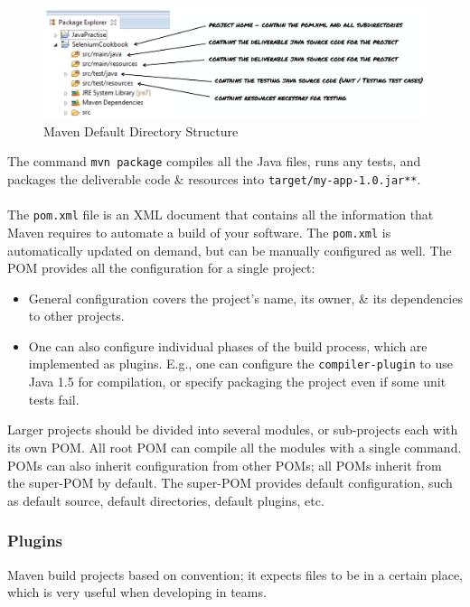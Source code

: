 \documentclass[a4paper,11pt]{article}
\begin{document}
\begin{figure}[H]
    \centering
    \includegraphics[width=\textwidth]{images/mvn_dir_structure.png}
    \caption{Maven Default Directory Structure}
\end{figure}

The command \texttt{mvn package} compiles all the Java files, runs any tests, and packages the 
deliverable code \& resources into \verb|target/my-app-1.0.jar**|.
\\\\
The \verb|pom.xml| file is an XML document that contains all the information that Maven requires to automate 
a build of your software.
The \verb|pom.xml| is automatically updated on demand, but can be manually configured as well.
The POM provides all the configuration for a single project:
\begin{itemize}
    \item   General configuration covers the project's name, its owner, \& its dependencies to other projects.
    \item   One can also configure individual phases of the build process, which are implemented as plugins.
            E.g., one can configure the \verb|compiler-plugin| to use Java 1.5 for compilation, or specify
            packaging the project even if some unit tests fail.
\end{itemize}

Larger projects should be divided into several modules, or sub-projects each with its own POM.
All root POM can compile all the modules with a single command.
POMs can also inherit configuration from other POMs; all POMs inherit from the super-POM by default.
The super-POM provides default configuration, such as default source, default directories, default plugins,
etc.

\subsubsection{Plugins}
Maven build projects based on convention; it expects files to be in a certain place, which is very useful 
when developing in teams.
\end{document}

